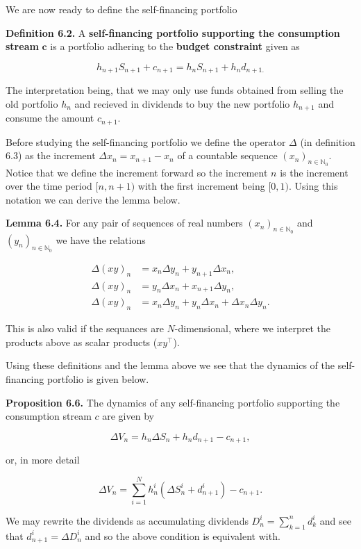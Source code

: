 \documentclass[
]{article}
\begin{document}
We are now ready to define the self-financing portfolio

\textbf{Definition 6.2.} A \textbf{self-financing portfolio supporting
the consumption stream} \(\mathbf{c}\) is a portfolio adhering to the
\textbf{budget constraint} given as

\[
h_{n+1}S_{n+1}+c_{n+1}=h_nS_{n+1}+h_nd_{n+1.}
\]

The interpretation being, that we may only use funds obtained from
selling the old portfolio \(h_n\) and recieved in dividends to buy the
new portfolio \(h_{n+1}\) and consume the amount \(c_{n+1}\).

Before studying the self-financing portfolio we define the operator
\(\Delta\) (in definition 6.3) as the increment
\(\Delta x_n=x_{n+1}-x_n\) of a countable sequence
\((x_n)_{n\in\mathbb{N}_0}\). Notice that we define the increment
forward so the increment \(n\) is the increment over the time period
\([n,n+1)\) with the first increment being \([0,1)\). Using this
notation we can derive the lemma below.

\textbf{Lemma 6.4.} For any pair of sequences of real numbers
\((x_n)_{n\in\mathbb{N}_0}\) and \((y_n)_{n\in\mathbb{N}_0}\) we have
the relations

\begin{align*}
\Delta(xy)_n&=x_n\Delta y_n+y_{n+1}\Delta x_n,\\
\Delta(xy)_n&=y_n\Delta x_n+x_{n+1}\Delta y_n,\\
\Delta(xy)_n&=x_n\Delta y_n+y_n\Delta x_n+\Delta x_n\Delta y_n.
\end{align*}

This is also valid if the sequances are \(N\)-dimensional, where we
interpret the products above as scalar products (\(xy^\top\)).

Using these definitions and the lemma above we see that the dynamics of
the self-financing portfolio is given below.

\textbf{Proposition 6.6.} The dynamics of any self-financing portfolio
supporting the consumption stream \(c\) are given by

\[
\Delta V_n=h_n \Delta S_n+h_nd_{n+1}-c_{n+1},
\]

or, in more detail

\[
\Delta V_n=\sum_{i=1}^Nh_n^i(\Delta S_n^i+d^i_{n+1})-c_{n+1}.
\]

We may rewrite the dividends as accumulating dividends
\(D^i_n=\sum_{k=1}^nd^i_k\) and see that \(d_{n+1}^i=\Delta D^i_n\) and
so the above condition is equivalent with.
\end{document}
